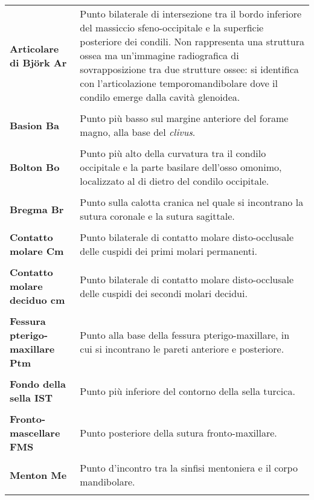 \begin{longtable}{>{\bfseries}p{5cm}X}
Articolare di Björk \newline Ar & Punto bilaterale di intersezione tra il bordo inferiore del massiccio sfeno-occipitale e la superficie posteriore dei condili. Non rappresenta una struttura ossea ma un'immagine radiografica di sovrapposizione tra due strutture ossee: si identifica con l'articolazione temporomandibolare dove il condilo emerge dalla cavità glenoidea.\\\\
Basion \newline Ba & Punto più basso sul margine anteriore del forame magno, alla base del \textit{clivus}.\\\\
Bolton \newline Bo & Punto più alto della curvatura tra il condilo occipitale e la parte basilare dell'osso omonimo, localizzato al di dietro del condilo occipitale.\\\\
Bregma \newline Br & Punto sulla calotta cranica nel quale si incontrano la sutura coronale e la sutura sagittale.\\\\
Contatto molare \newline Cm & Punto bilaterale di contatto molare disto-occlusale delle cuspidi dei primi molari permanenti.\\\\
Contatto molare deciduo \newline cm & Punto bilaterale di contatto molare disto-occlusale delle cuspidi dei secondi molari decidui.\\\\
Fessura pterigo-maxillare \newline Ptm & Punto alla base della fessura pterigo-maxillare, in cui si incontrano le pareti anteriore e posteriore.\\\\
Fondo della sella \newline IST & Punto più inferiore del contorno della sella turcica.\\\\
Fronto-mascellare \newline FMS & Punto posteriore della sutura fronto-maxillare.\\\\
Menton \newline Me & Punto d'incontro tra la sinfisi mentoniera e il corpo mandibolare.\\\\

\end{longtable}
